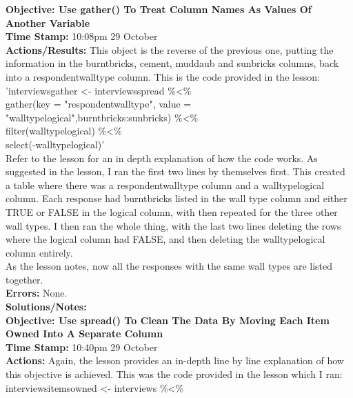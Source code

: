 \documentclass{article}
\begin{document}
\begin{FlushLeft}
\textbf{Objective: Use gather() To Treat Column Names As Values Of Another Variable}\\ 
\textbf{Time Stamp:} 10:08pm 29 October\\
\textbf{Actions/Results:} This object is the reverse of the previous one, putting the information in the burntbricks, cement, muddaub and sunbricks columns, back into a respondent\textunderscore wall\textunderscore type column. This is the code provided in the lesson:\\
'interviews\textunderscore gather \textless - interviews\textunderscore spread \%\textless\%\\
gather(key = "respondent\textunderscore wall\textunderscore type", value = "wall\textunderscore type\textunderscore logical",burntbricks:sunbricks) \%\textless\%\\
filter(wall\textunderscore type\textunderscore logical) \%\textless\%\\
select(-wall\textunderscore type\textunderscore logical)'\\
Refer to the lesson for an in depth explanation of how the code works. As suggested in the lesson, I ran the first two lines by themselves first. This created a table where there was a respondent\textunderscore wall\textunderscore type column and a wall\textunderscore type\textunderscore logical column. Each response had burntbricks listed in the wall type column and either TRUE or FALSE in the logical column, with then repeated for the three other wall types. I then ran the whole thing, with the last two lines deleting the rows where the logical column had FALSE, and then deleting the wall\textunderscore type\textunderscore logical column entirely.\\
As the lesson notes, now all the responses with the same wall types are listed together.\\
\textbf{Errors:} None.\\
\textbf{Solutions/Notes:}\\
\vspace{5mm}
\textbf{Objective: Use spread() To Clean The Data By Moving Each Item Owned Into A Separate Column}\\ 
\textbf{Time Stamp:} 10:40pm 29 October\\
\textbf{Actions:} Again, the lesson provides an in-depth line by line explanation of how this objective is achieved. This was the code provided in the lesson which I ran:
interviews\textunderscore items\textunderscore owned \textless - interviews \%\textless\%\\

\end{FlushLeft}
\end{document}
